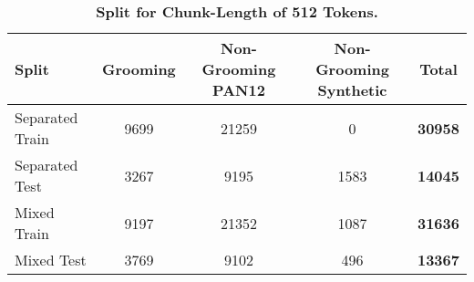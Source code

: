 \begin{table}[H]
\centering
\small
\begin{tabular}{lcccc}
\hline
Split & Grooming & Non-Grooming PAN12 & Non-Grooming Synthetic & \textbf{Total} \\
\hline
Separated Train & 9699 & 21259 & 0    & \textbf{30958} \\
Separated Test  & 3267 & 9195  & 1583 & \textbf{14045} \\
\midrule[\heavyrulewidth]
Mixed Train     & 9197 & 21352 & 1087 & \textbf{31636} \\
Mixed Test      & 3769 & 9102  & 496  & \textbf{13367} \\
\hline
\end{tabular}
\caption[Split for Chunk-Length of 512 Tokens]{\textbf{Split for Chunk-Length of 512 Tokens.}}
\end{table}
